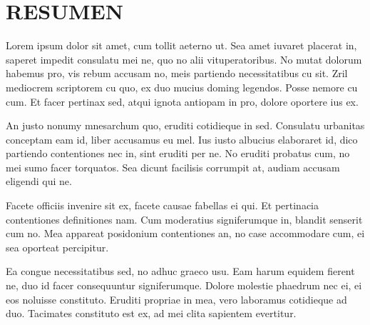 \chapter*{\center \Large RESUMEN}
Lorem ipsum dolor sit amet, cum tollit aeterno ut. Sea amet iuvaret placerat in, saperet impedit consulatu mei ne, quo no alii vituperatoribus. No mutat dolorum habemus pro, vis rebum accusam no, meis partiendo necessitatibus cu sit. Zril mediocrem scriptorem cu quo, ex duo mucius doming legendos. Posse nemore cu cum. Et facer pertinax sed, atqui ignota antiopam in pro, dolore oportere ius ex.

An justo nonumy mnesarchum quo, eruditi cotidieque in sed. Consulatu urbanitas conceptam eam id, liber accusamus eu mel. Ius iusto albucius elaboraret id, dico partiendo contentiones nec in, sint eruditi per ne. No eruditi probatus cum, no mei sumo facer torquatos. Sea dicunt facilisis corrumpit at, audiam accusam eligendi qui ne.

Facete officiis invenire sit ex, facete causae fabellas ei qui. Et pertinacia contentiones definitiones nam. Cum moderatius signiferumque in, blandit senserit cum no. Mea appareat posidonium contentiones an, no case accommodare cum, ei sea oporteat percipitur.

Ea congue necessitatibus sed, no adhuc graeco usu. Eam harum equidem fierent ne, duo id facer consequuntur signiferumque. Dolore molestie phaedrum nec ei, ei eos noluisse constituto. Eruditi propriae in mea, vero laboramus cotidieque ad duo. Tacimates constituto est ex, ad mei clita sapientem evertitur.
